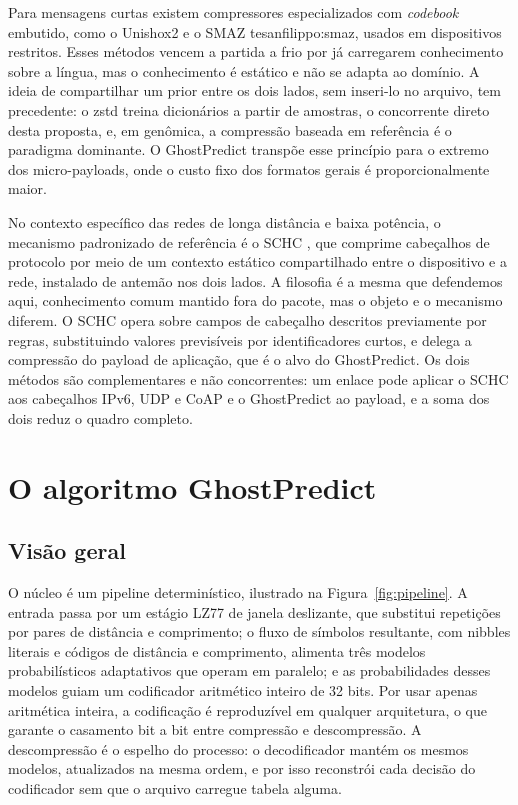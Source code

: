 \documentclass[12pt]{article}
\begin{document}
Para mensagens curtas existem compressores especializados com \textit{codebook}
embutido, como o Unishox2 \cite{ramanathan:22} e o SMAZ 	te{sanfilippo:smaz}, usados em dispositivos
restritos. Esses métodos vencem a partida a frio por já carregarem conhecimento
sobre a língua, mas o conhecimento é estático e não se adapta ao domínio. A
ideia de compartilhar um prior entre os dois lados, sem inseri-lo no arquivo,
tem precedente: o zstd treina dicionários a partir de amostras, o concorrente
direto desta proposta, e, em genômica, a compressão baseada em referência
\cite{fritz:11} é o paradigma dominante. O GhostPredict transpõe esse princípio
para o extremo dos micro-payloads, onde o custo fixo dos formatos gerais é
proporcionalmente maior.

No contexto específico das redes de longa distância e baixa potência, o
mecanismo padronizado de referência é o SCHC \cite{minaburo:20}, que comprime
cabeçalhos de protocolo por meio de um contexto estático compartilhado entre o
dispositivo e a rede, instalado de antemão nos dois lados. A filosofia é a mesma
que defendemos aqui, conhecimento comum mantido fora do pacote, mas o objeto e o
mecanismo diferem. O SCHC opera sobre campos de cabeçalho descritos previamente
por regras, substituindo valores previsíveis por identificadores curtos, e
delega a compressão do payload de aplicação, que é o alvo do GhostPredict. Os
dois métodos são complementares e não concorrentes: um enlace pode aplicar o
SCHC aos cabeçalhos IPv6, UDP e CoAP e o GhostPredict ao payload, e a soma dos
dois reduz o quadro completo.

\section{O algoritmo GhostPredict}
\label{sec:algoritmo}

\subsection{Visão geral}

O núcleo é um pipeline determinístico, ilustrado na Figura~\ref{fig:pipeline}. A
entrada passa por um estágio LZ77 de janela deslizante, que substitui repetições
por pares de distância e comprimento; o fluxo de símbolos resultante, com
nibbles literais e códigos de distância e comprimento, alimenta três modelos
probabilísticos adaptativos que operam em paralelo; e as probabilidades desses
modelos guiam um codificador aritmético inteiro de 32 bits. Por usar apenas
aritmética inteira, a codificação é reproduzível em qualquer arquitetura, o que
garante o casamento bit a bit entre compressão e descompressão. A descompressão
é o espelho do processo: o decodificador mantém os mesmos modelos, atualizados
na mesma ordem, e por isso reconstrói cada decisão do codificador sem que o
arquivo carregue tabela alguma.
\end{document}
